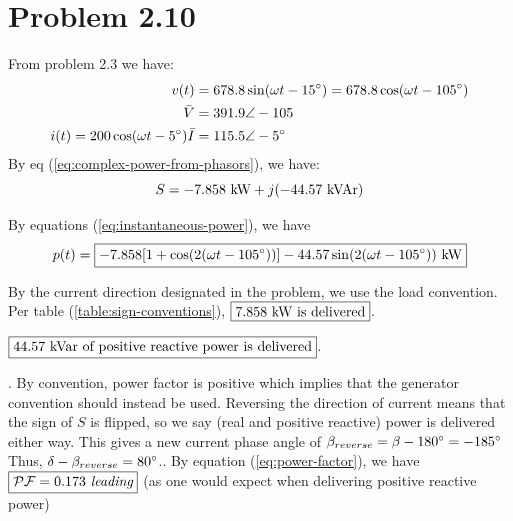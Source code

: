 \documentclass{homework}
\begin{document}
\section{Problem 2.10}
From problem 2.3 we have:
\begin{align*}
    v(t) &= 678.8 \sin(\omega t - 15 \degree)
        = 678.8\cos(\omega t - 105 \degree) \\
    \bar{V} &= 391.9 \angle -105 \\
    i(t) = 200 \cos(\omega t - 5\degree)
    \bar{I} &=  115.5 \angle -5 \degree
\end{align*}
By eq (\ref{eq:complex-power-from-phasors}),
we have:
\begin{equation*}
    S = -7.858 \text{ kW} + j (- 44.57 \text{ kVAr})
\end{equation*}
\begin{letterenum}
    \item By equations (\ref{eq:instantaneous-power}), we
        have
        \begin{equation*}
            p(t) = \boxed{-7.858 [1 + \cos(2(\omega t - 105 \degree))]
                - 44.57 \sin(2(\omega t - 105 \degree)) \text{ kW}}
        \end{equation*}
    \item By the current direction designated in the problem,
         we use the load convention. Per table
        (\ref{table:sign-conventions}), $\boxed{$7.858 kW
        is delivered$}$.
    \item $\boxed{$44.57 kVar of positive reactive power is delivered$}$.
    \item . By convention, power factor is positive
        which implies that the generator convention should
        instead be used. Reversing the direction of current
        means that the sign of $S$ is flipped, so we say
        (real and positive reactive) power is delivered either
        way. This gives a new current phase angle of
        $\beta_{reverse} = \beta - 180\degree = -185\degree$
        Thus, $\delta - \beta_{reverse} = 80 \degree$..
        By equation (\ref{eq:power-factor}), we have $\boxed{\mathcal{PF} = 0.173$
        {\it leading}$}$ (as one would expect
        when delivering positive reactive power)

\end{letterenum}
\end{document}

